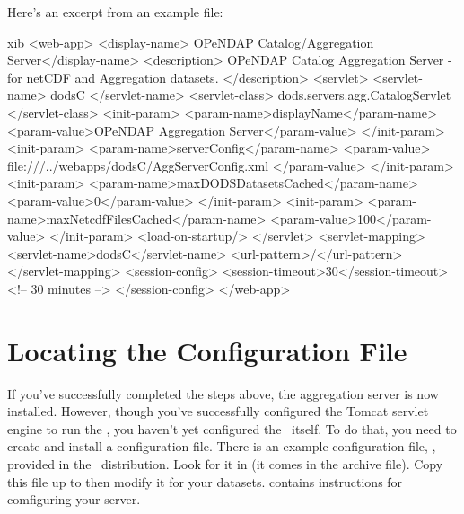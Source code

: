 \documentclass{dods-book}
\begin{document}
\begin{enumerate}
Here's an excerpt from an example  file:

\label{agg,webxmlex}
\begin{vcode}{xib}
<web-app>
  <display-name> OPeNDAP Catalog/Aggregation Server</display-name>
  <description>
    OPeNDAP Catalog Aggregation Server - for netCDF and 
    Aggregation datasets.
  </description>
  <servlet>
    <servlet-name> dodsC </servlet-name>
    <servlet-class> 
      dods.servers.agg.CatalogServlet 
    </servlet-class>
    <init-param>
      <param-name>displayName</param-name>
      <param-value>OPeNDAP Aggregation Server</param-value>
    </init-param>
    <init-param>
      <param-name>serverConfig</param-name>
      <param-value>
        file:///../webapps/dodsC/AggServerConfig.xml
      </param-value>
    </init-param>
    <init-param>
      <param-name>maxDODSDatasetsCached</param-name>
      <param-value>0</param-value>
    </init-param>
    <init-param>
      <param-name>maxNetcdfFilesCached</param-name>
      <param-value>100</param-value>
    </init-param>
    <load-on-startup/>
  </servlet>
  <servlet-mapping>
    <servlet-name>dodsC</servlet-name>
    <url-pattern>/</url-pattern>
  </servlet-mapping>
  <session-config>
    <session-timeout>30</session-timeout>
    <!-- 30 minutes -->
  </session-config>
</web-app>
\end{vcode}

\end{enumerate}

\section{Locating the Configuration File}


If you've successfully completed the steps above, the aggregation
server is now installed.  However, though you've successfully
configured the Tomcat servlet engine to run the \aggser , you haven't
yet configured the \aggser\ itself.   To do that,
you need to create 
and install a configuration file.  There is an example configuration
file, , provided in the \aggser\ 
distribution.  Look for it in
 (it comes in the
 archive file).  Copy this file up to
 then modify it for your datasets.
\chapterref{aggser,configure} contains instructions for comfiguring
your server.
\end{document}
